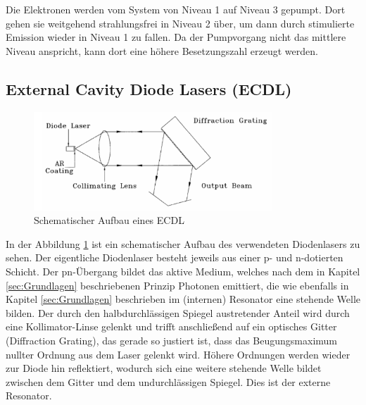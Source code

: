 Die Elektronen werden vom System von Niveau 1 auf Niveau 3 gepumpt. 
Dort gehen sie weitgehend strahlungsfrei in Niveau 2 über, 
um dann durch stimulierte Emission wieder in Niveau 1 zu fallen.
Da der Pumpvorgang nicht das mittlere Niveau anspricht,
kann dort eine höhere Besetzungszahl erzeugt werden. 


\subsection{External Cavity Diode Lasers (ECDL)}
\begin{figure}[h]
    \centering
    \includegraphics[width=0.8\textwidth]{abb/Aufbau.png}
    \caption{Schematischer Aufbau eines ECDL \cite{laser}}
    \label{fig:aufbau}
\end{figure}
In der Abbildung \ref{fig:aufbau} ist ein schematischer Aufbau des verwendeten Diodenlasers zu sehen.
Der eigentliche Diodenlaser besteht jeweils aus einer p- und n-dotierten Schicht.
Der pn-Übergang bildet das aktive Medium, 
welches nach dem in Kapitel \ref{sec:Grundlagen} beschriebenen Prinzip Photonen emittiert,
die wie ebenfalls in Kapitel \ref{sec:Grundlagen} beschrieben im (internen) Resonator eine stehende Welle bilden.
Der durch den halbdurchlässigen Spiegel austretender Anteil wird durch eine Kollimator-Linse gelenkt
und trifft anschließend auf ein optisches Gitter (Diffraction Grating),
das gerade so justiert ist, 
dass das Beugungsmaximum nullter Ordnung aus dem Laser gelenkt wird.
Höhere Ordnungen werden wieder zur Diode hin reflektiert,
wodurch sich eine weitere stehende Welle bildet zwischen dem Gitter und dem undurchlässigen Spiegel.
Dies ist der externe Resonator.

